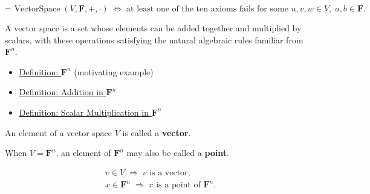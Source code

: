 \begin{remark*}
\[
\neg\,\operatorname{VectorSpace}(V,\mathbf{F},+,\cdot)
\;\Longleftrightarrow\;
\text{at least one of the ten axioms fails for some } u,v,w \in V,\; a,b \in \mathbf{F}.
\]
\end{remark*}

\begin{remark*}[Interpretation]
A vector space is a set whose elements can be added together and multiplied
by scalars, with these operations satisfying the natural algebraic rules
familiar from $\mathbf{F}^n$.
\end{remark*}

\begin{remark*}[Dependencies]
\begin{itemize}
  \item \hyperref[def:Fn]{Definition: $\mathbf{F}^n$} (motivating example)
  \item \hyperref[def:addition-in-Fn]{Definition: Addition in $\mathbf{F}^n$}
  \item \hyperref[def:scalar-multiplication-in-Fn]{Definition: Scalar Multiplication in $\mathbf{F}^n$}
\end{itemize}
\end{remark*}


\begin{tcolorbox}[colback=defbox, colframe=defborder, arc=2pt,
  left=6pt, right=6pt, top=4pt, bottom=4pt,
  title={\small\textbf{Definition (Vector and Point)}},
  fonttitle=\small\bfseries]
\begin{definition}
\label{def:vector-and-point}
An element of a vector space $V$ is called a \textbf{vector}.

When $V = \mathbf{F}^n$, an element of $\mathbf{F}^n$ may also be called
a \textbf{point}.
\end{definition}
\end{tcolorbox}

\begin{remark*}
\[
\begin{aligned}
&v \in V \;\Longrightarrow\; v \text{ is a vector}, \\
&x \in \mathbf{F}^n \;\Longrightarrow\; x \text{ is a point of } \mathbf{F}^n.
\end{aligned}
\]
\end{remark*}

